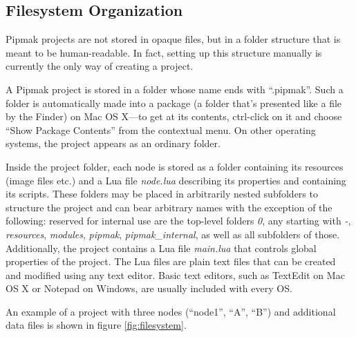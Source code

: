 \documentclass[
	a4paper,
	pagesize,
	10pt,
	oneside,
	idxtotoc,
	bibtotoc,
	BCOR10mm,
	DIV10
]{scrartcl} %
\newcommand{\emphindexed}[1]{\emph{#1}\index{#1}}
\begin{document}
\subsection{Filesystem Organization}
Pipmak projects are not stored in opaque files, but in a folder structure that is meant to be human-readable. In fact, setting up this structure manually is currently the only way of creating a project.

A Pipmak project is stored in a folder whose name ends with “.pipmak”. Such a folder is automatically made into a package (a folder that's presented like a file by the Finder) on Mac OS X—to get at its contents, ctrl-click on it and choose “Show Package Contents” from the contextual menu. On other operating systems, the project appears as an ordinary folder.

Inside the project folder, each node is stored as a folder containing its resources (image files etc.) and a Lua file \emphindexed{node.lua} describing its properties and containing its scripts. These folders may be placed in arbitrarily nested subfolders to structure the project and can bear arbitrary names with the exception of the following: reserved for internal use are the top-level folders \emph{0}, any starting with \emph{-}, \emph{resources}, \emph{modules}, \emph{pipmak}, \emph{pipmak\_internal}, as well as all subfolders of those. Additionally, the project contains a Lua file \emphindexed{main.lua} that controls global properties of the project. The Lua files are plain text files that can be created and modified using any text editor. Basic text editors, such as TextEdit on Mac OS X or Notepad on Windows, are usually included with every OS.

An example of a project with three nodes (“node1”, “A”, “B”) and additional data files is shown in figure \ref{fig:filesystem}.
\end{document}
